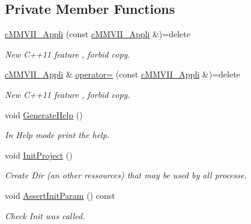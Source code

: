 \subsection*{Private Member Functions}
\begin{DoxyCompactItemize}
\item 
\hyperlink{classMMVII_1_1cMMVII__Appli_ae18252a40bef1588529b262ff028a9a5}{c\+M\+M\+V\+I\+I\+\_\+\+Appli} (const \hyperlink{classMMVII_1_1cMMVII__Appli}{c\+M\+M\+V\+I\+I\+\_\+\+Appli} \&)=delete\hypertarget{classMMVII_1_1cMMVII__Appli_ae18252a40bef1588529b262ff028a9a5}{}\label{classMMVII_1_1cMMVII__Appli_ae18252a40bef1588529b262ff028a9a5}

\begin{DoxyCompactList}\small\item\em New C++11 feature , forbid copy. \end{DoxyCompactList}\item 
\hyperlink{classMMVII_1_1cMMVII__Appli}{c\+M\+M\+V\+I\+I\+\_\+\+Appli} \& \hyperlink{classMMVII_1_1cMMVII__Appli_a454da2fff09b00103fcbe567759de6db}{operator=} (const \hyperlink{classMMVII_1_1cMMVII__Appli}{c\+M\+M\+V\+I\+I\+\_\+\+Appli} \&)=delete\hypertarget{classMMVII_1_1cMMVII__Appli_a454da2fff09b00103fcbe567759de6db}{}\label{classMMVII_1_1cMMVII__Appli_a454da2fff09b00103fcbe567759de6db}

\begin{DoxyCompactList}\small\item\em New C++11 feature , forbid copy. \end{DoxyCompactList}\item 
void \hyperlink{classMMVII_1_1cMMVII__Appli_ae11b4082949e6e783025f17ee02bf317}{Generate\+Help} ()\hypertarget{classMMVII_1_1cMMVII__Appli_ae11b4082949e6e783025f17ee02bf317}{}\label{classMMVII_1_1cMMVII__Appli_ae11b4082949e6e783025f17ee02bf317}

\begin{DoxyCompactList}\small\item\em In Help mode print the help. \end{DoxyCompactList}\item 
void \hyperlink{classMMVII_1_1cMMVII__Appli_a7c9e1449f451bad261cdd6a811ececfc}{Init\+Project} ()\hypertarget{classMMVII_1_1cMMVII__Appli_a7c9e1449f451bad261cdd6a811ececfc}{}\label{classMMVII_1_1cMMVII__Appli_a7c9e1449f451bad261cdd6a811ececfc}

\begin{DoxyCompactList}\small\item\em Create Dir (an other ressources) that may be used by all processe. \end{DoxyCompactList}\item 
void \hyperlink{classMMVII_1_1cMMVII__Appli_ac7e6e1f05df05cc98b72abdf8c161c13}{Assert\+Init\+Param} () const \hypertarget{classMMVII_1_1cMMVII__Appli_ac7e6e1f05df05cc98b72abdf8c161c13}{}\label{classMMVII_1_1cMMVII__Appli_ac7e6e1f05df05cc98b72abdf8c161c13}

\begin{DoxyCompactList}\small\item\em Check Init was called. \end{DoxyCompactList}\end{DoxyCompactItemize}
